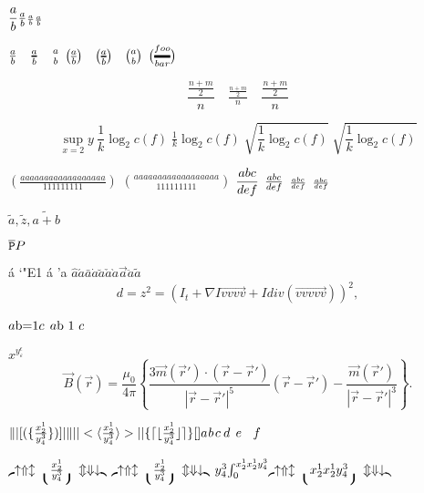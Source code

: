 \documentclass[useallsizes]{\myclass}
\begin{document}
$\genfrac{}{}{}0ab 
\genfrac{}{}{}1ab 
\genfrac{}{}{}2ab 
\genfrac{}{}{}3ab $

${a\over b}\quad {a\above1pt b}\quad {a\atop b}$
${a\overwithdelims() b}\quad {a\abovewithdelims()1pt b}\quad
{a\atopwithdelims() b}$
$\dimen0=2pt\genfrac(){\dimen0 }{}{foo}{bar}$


$$\frac{\frac{n+m}{2}} n \quad
\tfrac{\frac{n+m}{2}} n \quad
\dfrac{\frac{n+m}{2}} n$$



$$
\sup_{x=2}y~
\frac{1}{k}\log_2 c(f)\;
\tfrac{1}{k}\log_2 c(f)\;
\sqrt{\frac{1}{k}\log_2 c(f)}\;
\sqrt{\dfrac{1}{k}\log_2 c(f)}
$$





$\genfrac(){1mm}{3}{aaaaaaaaaaaaaaaaaa}{111111111}$
$\genfrac(){0pt}{3}{aaaaaaaaaaaaaaaaaa}{111111111}$
$\genfrac{}{}{}{0}{abc}{def}$
$\genfrac{}{}{}{1}{abc}{def}$
$\genfrac{}{}{}{2}{abc}{def}$
$\genfrac{}{}{}{3}{abc}{def}$



$\tilde a,\tilde z, \tilde{a+b}$



$\overline {\tt P} P$



á  \char`\á  \char"E1  \'a  \a'a    
$\hat{a} \acute{a}  \bar{a} \dot{a} \breve{a}
\check{a} \grave{a} \vec{a} \ddot{a} \tilde{a}
$ 
$$d=z^2=( I_t + \nabla I\vec{vvvv} +I div(\vec{vvvvv}) )^2,$$

$a\hbox{b=1} c$
$a\hbox{b~1}~c$ %


$x^{y^\epsilon_\varepsilon}$
\begin{equation}
\vec B(\vec r) = \frac{\mu_0}{4\pi}\left\{
\frac{3\vec m({\vec r}')\cdot(\vec r-{\vec r}')}{|\vec r-{\vec r}'|^5}
(\vec r-{\vec r}') - \frac{\vec m({\vec r}')}{|\vec r-{\vec r}'|^3}
\right\}. \label{W102}
\end{equation}

$
\def\kernel{\frac{x^1_2}{y^3_4}}
\left\Vert\left|\left[\left(\left\{ \kernel \right\}\right)\right]\right|\right\Vert
\left\vert\left|\left<\left\langle \kernel \right\rangle\right>\right|\right\vert
\left\lbrace\left\lceil\left\lfloor \kernel \right\rfloor\right\rceil\right\rbrace
\lbrack\rbrack
a\mskip1mu b\mskip2mu c \mskip4mu d \mskip8mu e \mskip16mu f
$

\def\kernel{\frac{x^1_2}{y^3_4}}
\def\test{
\left\lmoustache\left\uparrow\left\Uparrow\left\updownarrow\left\lgroup
\kernel
\right\rgroup\right\Updownarrow\right\Downarrow\right\downarrow\right\rmoustache}
$\test$
$\let\left\relax\let\right\relax \test$
$\def\kernel{\int_0^{\frac{x^1_2}{y^3_4}}} \test$
\end{document}
